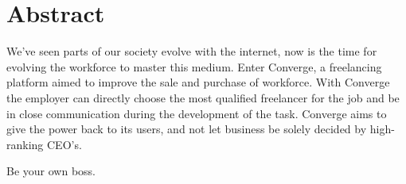 \chapter{Abstract}

We’ve seen parts of our society evolve with the internet, now is the time for evolving the workforce to master this medium. Enter Converge, a freelancing platform aimed to improve the sale and purchase of workforce. With Converge the employer can directly choose the most qualified freelancer for the job and be in close communication during the development of the task. Converge aims to give the power back to its users, and not let business be solely decided by high-ranking CEO’s.

Be your own boss.
